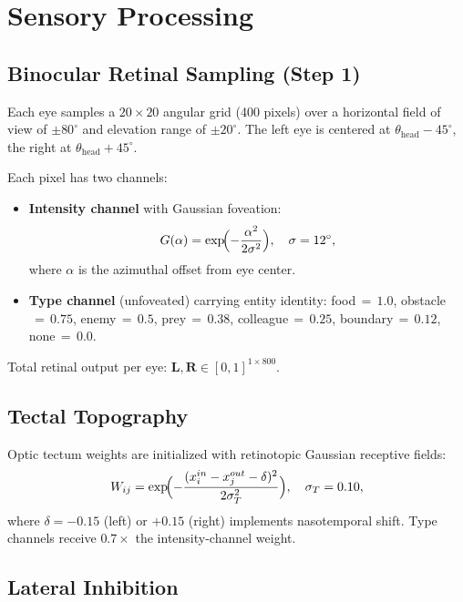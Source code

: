 \documentclass[11pt,a4paper]{article}
\begin{document}
\section{Sensory Processing}\label{sec:sensory}

\subsection{Binocular Retinal Sampling (Step 1)}

Each eye samples a $20\times 20$ angular grid (400 pixels) over a horizontal
field of view of $\pm 80^\circ$ and elevation range of $\pm 20^\circ$.
The left eye is centered at $\theta_{\text{head}} - 45^\circ$, the right at
$\theta_{\text{head}} + 45^\circ$.

Each pixel has two channels:
\begin{itemize}[nosep]
  \item \textbf{Intensity channel} with Gaussian foveation:
    \begin{equation}\label{eq:foveation}
      G(\alpha) = \exp\!\Bigl(-\frac{\alpha^2}{2\sigma^2}\Bigr),
      \quad \sigma = 12^\circ,
    \end{equation}
    where $\alpha$ is the azimuthal offset from eye center.
  \item \textbf{Type channel} (unfoveated) carrying entity identity:
    food$\,{=}\,1.0$, obstacle$\,{=}\,0.75$, enemy$\,{=}\,0.5$,
    prey$\,{=}\,0.38$, colleague$\,{=}\,0.25$,
    boundary$\,{=}\,0.12$, none$\,{=}\,0.0$.
\end{itemize}

Total retinal output per eye: $\mathbf{L}, \mathbf{R} \in [0,1]^{1\times 800}$.

\subsection{Tectal Topography}

Optic tectum weights are initialized with retinotopic Gaussian receptive
fields:
\begin{equation}\label{eq:topography}
  W_{ij} = \exp\!\Bigl(-\frac{(x_i^{in} - x_j^{out} - \delta)^2}{2\sigma_T^2}\Bigr),
  \quad \sigma_T = 0.10,
\end{equation}
where $\delta = -0.15$ (left) or $+0.15$ (right) implements nasotemporal shift.
Type channels receive $0.7\times$ the intensity-channel weight.

\subsection{Lateral Inhibition}
\end{document}
